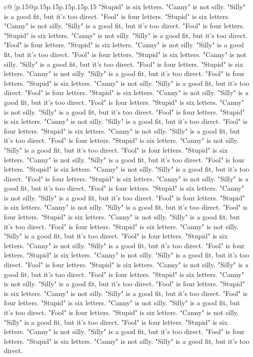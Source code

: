 \documentclass{article}
\begin{document}
{\begin{supertabular}{c@{$\;$}|p{.15\linewidth}@{}p{.15\linewidth}p{.15\linewidth}p{.15\linewidth}p{.15\linewidth}p{.15\linewidth}}
{{{"Stupid" is six letters. "Canny" is not silly. "Silly" is a good fit, but it's too direct. "Fool" is four letters. "Stupid" is six letters. "Canny" is not silly. "Silly" is a good fit, but it's too direct. "Fool" is four letters. "Stupid" is six letters. "Canny" is not silly. "Silly" is a good fit, but it's too direct. "Fool" is four letters. "Stupid" is six letters. "Canny" is not silly. "Silly" is a good fit, but it's too direct. "Fool" is four letters. "Stupid" is six letters. "Canny" is not silly. "Silly" is a good fit, but it's too direct. "Fool" is four letters. "Stupid" is six letters. "Canny" is not silly. "Silly" is a good fit, but it's too direct. "Fool" is four letters. "Stupid" is six letters. "Canny" is not silly. "Silly" is a good fit, but it's too direct. "Fool" is four letters. "Stupid" is six letters. "Canny" is not silly. "Silly" is a good fit, but it's too direct. "Fool" is four letters. "Stupid" is six letters. "Canny" is not silly. "Silly" is a good fit, but it's too direct. "Fool" is four letters. "Stupid" is six letters. "Canny" is not silly. "Silly" is a good fit, but it's too direct. "Fool" is four letters. "Stupid" is six letters. "Canny" is not silly. "Silly" is a good fit, but it's too direct. "Fool" is four letters. "Stupid" is six letters. "Canny" is not silly. "Silly" is a good fit, but it's too direct. "Fool" is four letters. "Stupid" is six letters. "Canny" is not silly. "Silly" is a good fit, but it's too direct. "Fool" is four letters. "Stupid" is six letters. "Canny" is not silly. "Silly" is a good fit, but it's too direct. "Fool" is four letters. "Stupid" is six letters. "Canny" is not silly. "Silly" is a good fit, but it's too direct. "Fool" is four letters. "Stupid" is six letters. "Canny" is not silly. "Silly" is a good fit, but it's too direct. "Fool" is four letters. "Stupid" is six letters. "Canny" is not silly. "Silly" is a good fit, but it's too direct. "Fool" is four letters. "Stupid" is six letters. "Canny" is not silly. "Silly" is a good fit, but it's too direct. "Fool" is four letters. "Stupid" is six letters. "Canny" is not silly. "Silly" is a good fit, but it's too direct. "Fool" is four letters. "Stupid" is six letters. "Canny" is not silly. "Silly" is a good fit, but it's too direct. "Fool" is four letters. "Stupid" is six letters. "Canny" is not silly. "Silly" is a good fit, but it's too direct. "Fool" is four letters. "Stupid" is six letters. "Canny" is not silly. "Silly" is a good fit, but it's too direct. "Fool" is four letters. "Stupid" is six letters. "Canny" is not silly. "Silly" is a good fit, but it's too direct. "Fool" is four letters. "Stupid" is six letters. "Canny" is not silly. "Silly" is a good fit, but it's too direct. "Fool" is four letters. "Stupid" is six letters. "Canny" is not silly. "Silly" is a good fit, but it's too direct. "Fool" is four letters. "Stupid" is six letters. "Canny" is not silly. "Silly" is a good fit, but it's too direct. "Fool" is four letters. "Stupid" is six letters. "Canny" is not silly. "Silly" is a good fit, but it's too direct. "Fool" is four letters. "Stupid" is six letters. "Canny" is not silly. "Silly" is a good fit, but it's too direct. }}}
\end{supertabular}}
\end{document}
